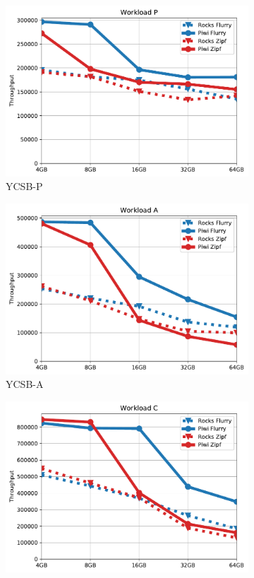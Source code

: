 \begin{figure}[tb]
\centering
\begin{subfigure}{0.3\linewidth}
\includegraphics[width=\textwidth]{figs/Workload_P_line.pdf}
\caption{YCSB-P}
\label{fig:throughput:p}
\end{subfigure}
\begin{subfigure}{0.3\linewidth}
\includegraphics[width=\textwidth]{figs/Workload_A_line.pdf}
\caption{YCSB-A}
\label{fig:throughput:a}
\end{subfigure}
\begin{subfigure}{0.3\linewidth}
\includegraphics[width=\textwidth]{figs/Workload_C_line.pdf}

\end{subfigure}
\end{figure}
